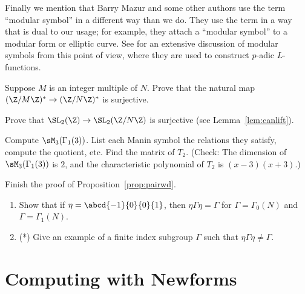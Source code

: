 Finally we mention that Barry Mazur and some other authors 
use the term ``modular symbol''
in a different way than we do.
They use the term in a way that is dual
to our usage; for example, they attach a ``modular symbol'' to
a modular form or elliptic curve.   
See \cite{mtt} for an extensive discussion
of modular symbols from this point of view, where they are used to
construct $p$-adic $L$-functions.


\begin{exercises}
\item \label{ex:surjredmod}
Suppose $M$ is an integer multiple of $N$.  Prove
that the natural map $(\Z/M\Z)^* \to (\Z/N\Z)^*$ is surjective.

\item \label{ex:surjred}
Prove that $\SL_2(\Z)\to \SL_2(\Z/N\Z)$ is surjective
(see Lemma~\ref{lem:canlift}).

\item \label{ex:m3g13}
Compute $\sM_{3}(\Gamma_1(3))$.  List
each Manin symbol the relations they satisfy, compute
the quotient, etc.  Find the matrix of $T_2$.
(Check: The dimension of $\sM_{3}(\Gamma_1(3))$ is $2$, and
the characteristic polynomial of $T_2$ is $(x-3)(x+3)$.)

\item \label{ex:pairingwd} 
Finish the proof of Proposition~\ref{prop:pairwd}.

\item \label{ex:etaconj}
\begin{enumerate}
\item Show that if $\eta = \abcd{-1}{0}{0}{1}$, then
$\eta \Gamma \eta = \Gamma$ for $\Gamma=\Gamma_0(N)$
and $\Gamma=\Gamma_1(N)$.  
\item (*) Give an example of a finite index
subgroup $\Gamma$ such that $\eta \Gamma \eta \neq \Gamma$.
\end{enumerate}


\end{exercises}




















\chapter{Computing with Newforms}\label{ch:modformcomp}

